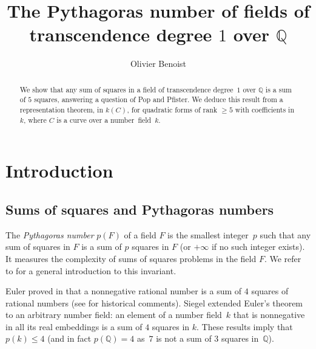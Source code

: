 \documentclass{amsart}
\theoremstyle{definition}
\theoremstyle{remark}
\numberwithin{equation}{section}
\def\Q{\mathbb Q}
\begin{document}
\title[The Pythagoras number of fields of transcendence degree \texorpdfstring{$1$}{1} over \texorpdfstring{$\Q$}{Q}]{The Pythagoras number of fields of transcendence degree \texorpdfstring{$1$}{1} over \texorpdfstring{$\Q$}{Q}}

\author{Olivier Benoist}
\address{D\'epartement de math\'ematiques et applications, \'Ecole normale sup\'erieure, CNRS,
45 rue d'Ulm, 75230 Paris Cedex 05, France}

\renewcommand{\abstractname}{Abstract}

\begin{abstract}
We show that any sum of squares in a field of transcendence degree~$1$ over $\Q$ is a sum of $5$ squares,
answering a question of Pop and Pfister. 
We deduce this result from a representation theorem, in $k(C)$,  for qua\-dratic forms of rank $\geq 5$ with coefficients in $k$, where $C$ is a curve over a number~field~$k$.
\end{abstract}

\maketitle


\section{Introduction}


\subsection{Sums of squares and Pythagoras numbers}

The \textit{Pythagoras number} $p(F)$ of a field $F$ is the smallest integer~$p$ such that any sum of squares in $F$ is a sum of $p$ squares in $F$ (or $+\infty$ if no such integer exists). It measures the complexity of sums of squares problems in the field $F$. We refer to \cite[Chap.\,7 \S 1]{Pfisterbook} for a general introduction to this invariant.

Euler proved in \cite{Euler} that a nonnegative rational number is a sum of $4$ squares of rational numbers (see \cite{Pieper} for historical comments). Siegel \cite{Siegel} extended Euler's theorem to an arbitrary number field: an element of a number field~$k$ that is nonnegative in all its real embeddings is a sum of $4$ squares in $k$. These results imply that $p(k)\leq 4$
(and in fact $p(\Q)=4$ as~$7$ is not a sum of $3$ squares in~$\Q$). 
\end{document}
